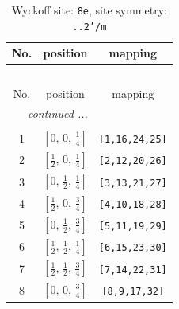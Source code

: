 \documentclass[fleqn,8pt]{jsarticle}
\begin{document}
\renewcommand{\arraystretch}{1.2}
\begin{longtable}{ccc}
\caption{Wyckoff site: {\tt 8e}, site symmetry: {\tt ..2'/m}}
 \\
 \hline \hline
No. & position & mapping \\ \hline \endfirsthead

\multicolumn{2}{l}{\tablename\ \thetable{}} \\
 \hline \hline
No. & position & mapping \\ \hline \endhead

 \hline \hline
\multicolumn{2}{r}{\footnotesize\it continued ...} \\ \endfoot

 \hline \hline
\multicolumn{2}{r}{} \\ \endlastfoot

1 & $\left[ 0,\, 0,\, \frac{1}{4} \right]$ & {\tt [1,16,24,25]} \\ \hline
2 & $\left[ \frac{1}{2},\, 0,\, \frac{1}{4} \right]$ & {\tt [2,12,20,26]} \\ \hline
3 & $\left[ 0,\, \frac{1}{2},\, \frac{1}{4} \right]$ & {\tt [3,13,21,27]} \\ \hline
4 & $\left[ \frac{1}{2},\, 0,\, \frac{3}{4} \right]$ & {\tt [4,10,18,28]} \\ \hline
5 & $\left[ 0,\, \frac{1}{2},\, \frac{3}{4} \right]$ & {\tt [5,11,19,29]} \\ \hline
6 & $\left[ \frac{1}{2},\, \frac{1}{2},\, \frac{1}{4} \right]$ & {\tt [6,15,23,30]} \\ \hline
7 & $\left[ \frac{1}{2},\, \frac{1}{2},\, \frac{3}{4} \right]$ & {\tt [7,14,22,31]} \\ \hline
8 & $\left[ 0,\, 0,\, \frac{3}{4} \right]$ & {\tt [8,9,17,32]} \\
\end{longtable}
\renewcommand{\arraystretch}{1.2}
\end{document}
